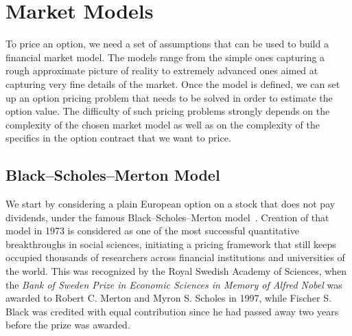 \documentclass{UUThesisTemplate}
\begin{document}
%
\section{Market Models}
\label{sec:models}
\par
To price an option, we need a set of assumptions that can be used to build a financial market model. The models range from the simple ones capturing a rough approximate picture of reality to extremely advanced ones aimed at capturing very fine details of the market. Once the model is defined, we can set up an option pricing problem that needs to be solved in order to estimate the option value. The difficulty of such pricing problems strongly depends on the complexity of the chosen market model as well as on the complexity of the specifics in the option contract that we want to price.  
%



%
\subsection{Black--Scholes--Merton Model}
\label{sub:bs}

\par
We start by considering a plain European option on a stock that does not pay dividends, under the famous Black--Scholes--Merton model~\cite{black73,merton73}. Creation of that model in 1973 is considered as one of the most successful quantitative breakthroughs in social sciences, initiating a pricing framework that still keeps occupied thousands of researchers across financial institutions and universities of the world. This was recognized by the Royal Swedish Academy of Sciences, when the \emph{Bank of Sweden Prize in Economic Sciences in Memory of Alfred Nobel} was awarded to Robert C. Merton and Myron S. Scholes in 1997, while Fischer S. Black was credited with equal contribution since he had passed away two years before the prize was awarded. 
\end{document}
